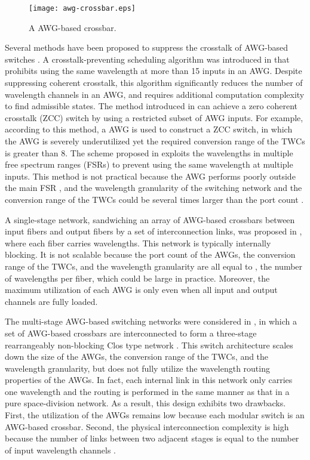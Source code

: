 \documentclass[journal]{IEEEtran}
\begin{document}
\begin{figure}[t]
\centering
\texttt{[image: awg-crossbar.eps]}
\caption{A  AWG-based crossbar.}\label{f_awgcrossbar}
\end{figure}

Several methods have been proposed to suppress the crosstalk of
AWG-based switches
\cite{Bianco:TON,Lucerna:HPSR2011,Maier:SPIE2000}. A
crosstalk-preventing scheduling algorithm was introduced in
\cite{Bianco:TON} that prohibits using the same wavelength at more
than 15 inputs in an AWG. Despite suppressing coherent crosstalk,
this algorithm significantly reduces the number of wavelength
channels in an AWG, and requires additional computation complexity
to find admissible states. The method introduced in
\cite{Lucerna:HPSR2011} can achieve a zero coherent crosstalk (ZCC)
switch by using a restricted subset of AWG inputs. For example,
according to this method, a  AWG is used to construct a
 ZCC switch, in which the AWG is severely underutilized
yet the required conversion range of the TWCs is greater than 8. The
scheme proposed in \cite{Maier:SPIE2000} exploits the wavelengths in
multiple free spectrum ranges (FSRs) to prevent using the same
wavelength at multiple inputs. This method is not practical because
the AWG performs poorly outside the main FSR
\cite{Kamei:JLT2009,Liu:EL1999}, and the wavelength granularity of
the switching network and the conversion range of the TWCs could be
several times larger than the port count .

A single-stage network, sandwiching an array of 
AWG-based crossbars between  input fibers and  output fibers
by a set of interconnection links, was proposed in
\cite{Pattavina:INFOCOM2006,Ramamirtham:INFOCOM2002}, where each
fiber carries  wavelengths. This network is typically internally
blocking. It is not scalable because the port count of the AWGs, the
conversion range of the TWCs, and the wavelength granularity are all
equal to , the number of wavelengths per fiber, which could be
large in practice. Moreover, the maximum utilization of each AWG is
only  even when all input and output channels are fully loaded.

The multi-stage AWG-based switching networks were considered in
\cite{Cheyns:CM2004,Ngo:TON2006,Zanzottera:HPSR2006}, in which a set
of AWG-based crossbars are interconnected to form a three-stage
rearrangeably non-blocking Clos type network \cite{Clos:BSTJ1953}.
This switch architecture scales down the size of the AWGs, the
conversion range of the TWCs, and the wavelength granularity, but
does not fully utilize the wavelength routing properties of the
AWGs. In fact, each internal link in this network only carries one
wavelength and the routing is performed in the same manner as that
in a pure space-division network. As a result, this design exhibits
two drawbacks. First, the utilization of the AWGs remains low
because each modular switch is an AWG-based crossbar. Second, the
physical interconnection complexity is high because the number of
links between two adjacent stages is equal to the number of input
wavelength channels .
\end{document}
